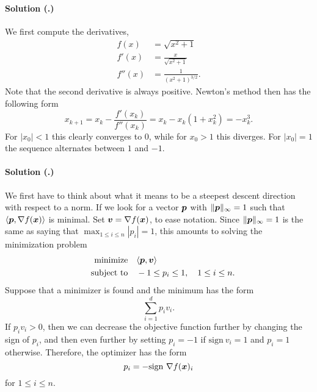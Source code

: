 \documentclass{article}
\newcounter{problemSheetNumber}
\newcounter{problems}
\renewcommand{\solution}[1]{\paragraph{Solution (\theproblemSheetNumber.\theproblems)}\addtocounter{problems}{1}\label{#1}}
\begin{document}
\solution{pr:5} We first compute the derivatives,
\begin{align*}
 f(x) &= \sqrt{x^2+1}\\
 f'(x) &= \frac{x}{\sqrt{x^2+1}}\\
 f''(x) &= \frac{1}{(x^2+1)^{3/2}}.
\end{align*}
Note that the second derivative is always positive.
Newton's method then has the following form
\begin{equation*}
 x_{k+1} = x_k - \frac{f'(x_k)}{f''(x_k)} = x_k - x_k(1+x_k^2) = -x_k^3.
\end{equation*}
For $|x_0|<1$ this clearly converges to $0$, while for $x_0>1$ this diverges. For $|x_0|=1$ the sequence alternates between $1$ and $-1$.

\solution{pr:6} We first have to think about what it means to be a steepest descent direction with respect to a norm. If we look for a vector $\bm{p}$ with $\Vert {\bm{p}}\Vert_\infty=1$ such that $\langle {\bm{p}}, {\nabla f(\bm{x})} \rangle$ is minimal. 
Set $\bm{v}=\nabla f(\bm{x})$, to ease notation. Since $\Vert {\bm{p}}\Vert_\infty = 1$ is the same as saying that $\max_{1\leq i\leq n} |p_i| = 1$, this amounts to solving the minimization problem
\begin{align*}
 \text{minimize}\quad& \langle {\bm{p}}, {\bm{v}} \rangle\\
 \quad\text{subject to}\quad & -1 \leq p_i \leq 1, \quad 1\leq i\leq n.
\end{align*}
Suppose that a minimizer is found and the minimum has the form
\begin{equation*}
 \sum_{i=1}^d p_i v_i.
\end{equation*}
If $p_iv_i>0$, then we can decrease the objective function further by changing the sign of $p_i$, and then even further by setting $p_i=-1$ if $\mathrm{sign} \ v_i=1$ and $p_i=1$ otherwise. Therefore, the optimizer has the form
\begin{equation*}
 p_i = -\mathrm{sign} \ \nabla f(\bm{x})_i
\end{equation*}
for $1\leq i\leq n$.
\end{document}
